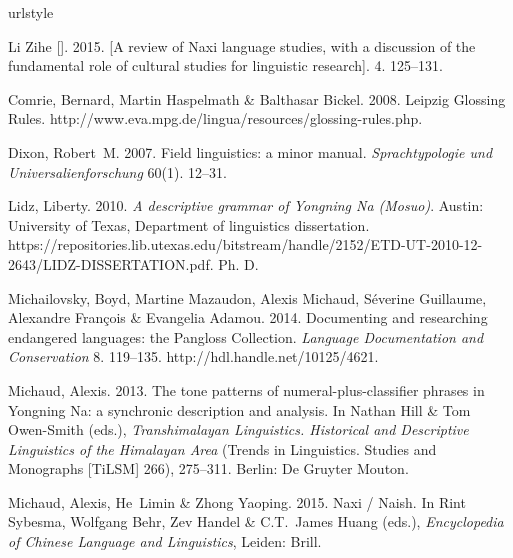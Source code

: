 \begin{thebibliography}{7}
	\providecommand{\natexlab}[1]{#1}
	\providecommand{\url}[1]{#1}
	\providecommand{\urlprefix}{}
	\expandafter\ifx\csname urlstyle\endcsname\relax
	\providecommand{\doi}[1]{doi:\discretionary{}{}{}#1}\else
	\providecommand{\doi}{doi:\discretionary{}{}{}\begingroup
		\urlstyle{rm}\Url}\fi
	
	Li Zihe []. 2015.
	\newblock
	[{A} review of {Naxi} language studies, with a discussion of the fundamental
	role of cultural studies for linguistic research].
	\newblock {} 4. 125--131.
	
	Comrie, Bernard, Martin Haspelmath \& Balthasar Bickel. 2008.
	\newblock Leipzig {Glossing Rules}.
	\newblock
	\urlprefix\url{http://www.eva.mpg.de/lingua/resources/glossing-rules.php}.
	
	Dixon, Robert~M. 2007.
	\newblock Field linguistics: a minor manual.
	\newblock \emph{Sprachtypologie und Universalienforschung} 60(1). 12--31.
	
	Lidz, Liberty. 2010.
	\newblock \emph{A descriptive grammar of {Yongning Na} ({Mosuo})}.
	\newblock Austin: University of Texas, Department of linguistics dissertation.
	\newblock
	\urlprefix\url{https://repositories.lib.utexas.edu/bitstream/handle/2152/ETD-UT-2010-12-2643/LIDZ-DISSERTATION.pdf}.
	\newblock Ph. D.
	
	Michailovsky, Boyd, Martine Mazaudon, Alexis Michaud, S{\'{e}}verine Guillaume,
	Alexandre Fran{\c{c}}ois \& Evangelia Adamou. 2014.
	\newblock Documenting and researching endangered languages: the {Pangloss
		Collection}.
	\newblock \emph{Language Documentation and Conservation} 8. 119--135.
	\newblock \urlprefix\url{http://hdl.handle.net/10125/4621}.
	
	Michaud, Alexis. 2013.
	\newblock The tone patterns of numeral-plus-classifier phrases in {Yongning
		Na}: a synchronic description and analysis.
	\newblock In Nathan Hill \& Tom Owen-Smith (eds.), \emph{Transhimalayan
		{Linguistics}. {Historical} and {Descriptive} {Linguistics} of the
		{Himalayan} {Area}} (Trends in {Linguistics}. {Studies} and {Monographs}
	[{TiLSM}] 266), 275--311. Berlin: De Gruyter Mouton.
	
	Michaud, Alexis, He~Limin \& Zhong Yaoping. 2015.
	\newblock Naxi / {Naish}.
	\newblock In Rint Sybesma, Wolfgang Behr, Zev Handel \& C.T.~James Huang
	(eds.), \emph{Encyclopedia of {Chinese} {Language} and {Linguistics}},
	Leiden: Brill.
	
\end{thebibliography}

